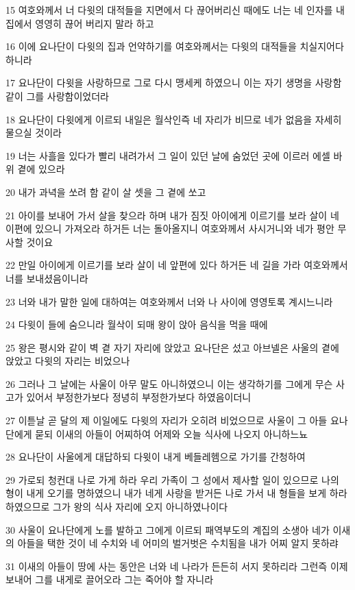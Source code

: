 \par 15 여호와께서 너 다윗의 대적들을 지면에서 다 끊어버리신 때에도 너는 네 인자를 내 집에서 영영히 끊어 버리지 말라 하고
\par 16 이에 요나단이 다윗의 집과 언약하기를 여호와께서는 다윗의 대적들을 치실지어다 하니라
\par 17 요나단이 다윗을 사랑하므로 그로 다시 맹세케 하였으니 이는 자기 생명을 사랑함 같이 그를 사랑함이었더라
\par 18 요나단이 다윗에게 이르되 내일은 월삭인즉 네 자리가 비므로 네가 없음을 자세히 물으실 것이라
\par 19 너는 사흘을 있다가 빨리 내려가서 그 일이 있던 날에 숨었던 곳에 이르러 에셀 바위 곁에 있으라
\par 20 내가 과녁을 쏘려 함 같이 살 셋을 그 곁에 쏘고
\par 21 아이를 보내어 가서 살을 찾으라 하며 내가 짐짓 아이에게 이르기를 보라 살이 네 이편에 있으니 가져오라 하거든 너는 돌아올지니 여호와께서 사시거니와 네가 평안 무사할 것이요
\par 22 만일 아이에게 이르기를 보라 살이 네 앞편에 있다 하거든 네 길을 가라 여호와께서 너를 보내셨음이니라
\par 23 너와 내가 말한 일에 대하여는 여호와께서 너와 나 사이에 영영토록 계시느니라
\par 24 다윗이 들에 숨으니라 월삭이 되매 왕이 앉아 음식을 먹을 때에
\par 25 왕은 평시와 같이 벽 곁 자기 자리에 앉았고 요나단은 섰고 아브넬은 사울의 곁에 앉았고 다윗의 자리는 비었으나
\par 26 그러나 그 날에는 사울이 아무 말도 아니하였으니 이는 생각하기를 그에게 무슨 사고가 있어서 부정한가보다 정녕히 부정한가보다 하였음이더니
\par 27 이튿날 곧 달의 제 이일에도 다윗의 자리가 오히려 비었으므로 사울이 그 아들 요나단에게 묻되 이새의 아들이 어찌하여 어제와 오늘 식사에 나오지 아니하느뇨
\par 28 요나단이 사울에게 대답하되 다윗이 내게 베들레헴으로 가기를 간청하여
\par 29 가로되 청컨대 나로 가게 하라 우리 가족이 그 성에서 제사할 일이 있으므로 나의 형이 내게 오기를 명하였으니 내가 네게 사랑을 받거든 나로 가서 내 형들을 보게 하라 하였으므로 그가 왕의 식사 자리에 오지 아니하였나이다
\par 30 사울이 요나단에게 노를 발하고 그에게 이르되 패역부도의 계집의 소생아 네가 이새의 아들을 택한 것이 네 수치와 네 어미의 벌거벗은 수치됨을 내가 어찌 알지 못하랴
\par 31 이새의 아들이 땅에 사는 동안은 너와 네 나라가 든든히 서지 못하리라 그런즉 이제 보내어 그를 내게로 끌어오라 그는 죽어야 할 자니라
